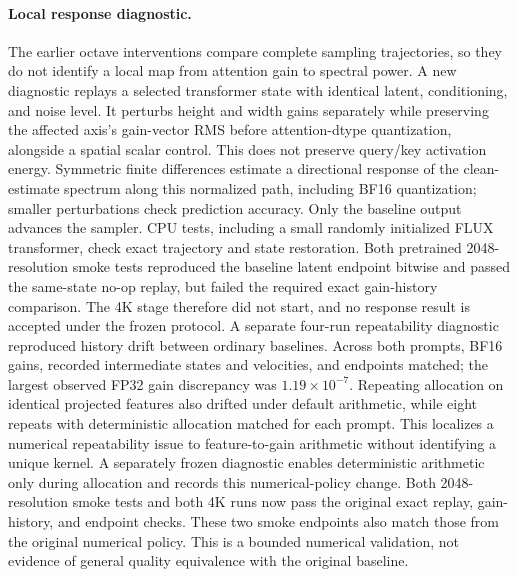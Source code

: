 \paragraph{Local response diagnostic.}
The earlier octave interventions compare complete sampling trajectories, so they
do not identify a local map from attention gain to spectral power. A new diagnostic
replays a selected transformer state with identical latent, conditioning, and
noise level. It perturbs height and width gains separately while preserving the
affected axis's gain-vector RMS before attention-dtype quantization, alongside a
spatial scalar control. This does not preserve query/key activation energy.
Symmetric finite differences estimate a directional response of the clean-estimate
spectrum along this normalized path, including BF16 quantization; smaller
perturbations check prediction accuracy. Only the baseline output advances the
sampler. CPU tests, including a small randomly initialized FLUX transformer, check
exact trajectory and state restoration. Both pretrained 2048-resolution smoke
tests reproduced the baseline latent endpoint bitwise and passed the same-state
no-op replay, but failed the required exact gain-history comparison. The 4K
stage therefore did not start, and no response result is accepted under the
frozen protocol. A separate four-run repeatability diagnostic reproduced history
drift between ordinary baselines. Across both prompts, BF16 gains, recorded
intermediate states and velocities, and endpoints matched; the largest observed
FP32 gain discrepancy was $1.19\times10^{-7}$. Repeating allocation on identical
projected features also drifted under default arithmetic, while eight repeats
with deterministic allocation matched for each prompt. This localizes a numerical
repeatability issue to feature-to-gain arithmetic without identifying a unique
kernel. A separately frozen diagnostic enables deterministic arithmetic only
during allocation and records this numerical-policy change. Both 2048-resolution
smoke tests and both 4K runs now pass the original exact replay, gain-history,
and endpoint checks. These two smoke endpoints also match those from the
original numerical policy. This is a bounded numerical validation, not evidence
of general quality equivalence with the original baseline.

